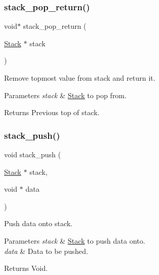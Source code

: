 \subsubsection{\texorpdfstring{stack\+\_\+pop\+\_\+return()}{stack\_pop\_return()}}
{\footnotesize\ttfamily void$\ast$ stack\+\_\+pop\+\_\+return (\begin{DoxyParamCaption}\item[{\hyperlink{structStack}{Stack} $\ast$}]{stack }\end{DoxyParamCaption})}



Remove topmost value from stack and return it. 


\begin{DoxyParams}{Parameters}
{\em stack} & \hyperlink{structStack}{Stack} to pop from. \\
\hline
\end{DoxyParams}
\begin{DoxyReturn}{Returns}
Previous top of stack. 
\end{DoxyReturn}
\mbox{\label{group__Stack_ga26f038389f7a063ff212ca6cfee41f2d}} 
\subsubsection{\texorpdfstring{stack\+\_\+push()}{stack\_push()}}
{\footnotesize\ttfamily void stack\+\_\+push (\begin{DoxyParamCaption}\item[{\hyperlink{structStack}{Stack} $\ast$}]{stack,  }\item[{void $\ast$}]{data }\end{DoxyParamCaption})}



Push data onto stack. 


\begin{DoxyParams}{Parameters}
{\em stack} & \hyperlink{structStack}{Stack} to push data onto. \\
\hline
{\em data} & Data to be pushed. \\
\hline
\end{DoxyParams}
\begin{DoxyReturn}{Returns}
Void. 
\end{DoxyReturn}
